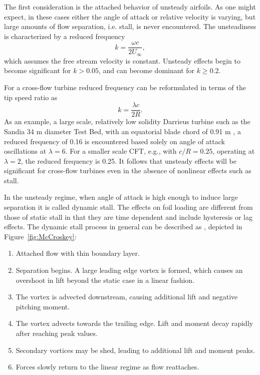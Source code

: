 The first consideration is the attached behavior of unsteady airfoils. As one
might expect, in these cases either the angle of attack or relative velocity is
varying, but large amounts of flow separation, i.e. stall, is never encountered.
The unsteadiness is characterized by a reduced frequency~\cite{Leishman2006}
\begin{equation}
    k = \frac{\omega c}{2 U_\infty},
\end{equation}
which assumes the free stream velocity is constant. Unsteady effects begin to
become significant for $k > 0.05$, and can become dominant for $k \ge 0.2$.

For a cross-flow turbine reduced frequency can be reformulated in terms of the
tip speed ratio as
\begin{equation}
    k = \frac{\lambda c}{2R}.
\end{equation}
As an example, a large scale, relatively low solidity Darrieus turbine such as
the Sandia 34 m diameter Test Bed, with an equatorial blade chord of 0.91 m
\cite{Murray2011}, a reduced frequency of 0.16 is encountered based solely on
angle of attack oscillations at $\lambda=6$. For a smaller scale CFT, e.g., with
$c/R = 0.25$, operating at $\lambda = 2$, the reduced frequency is 0.25. It
follows that unsteady effects will be significant for cross-flow turbines even
in the absence of nonlinear effects such as stall.

In the unsteady regime, when angle of attack is high enough to induce large
separation it is called dynamic stall. The effects on foil loading are different
from those of static stall in that they are time dependent and include
hysteresis or lag effects. The dynamic stall process in general can be described
as \cite{McCroskey1981}, depicted in Figure~\ref{fig:McCroskey}:
\begin{enumerate}
    \item Attached flow with thin boundary layer.

    \item Separation begins. A large leading edge vortex is formed, which causes
    an overshoot in lift beyond the static case in a linear fashion.
    
    \item The vortex is advected downstream, causing additional lift and
    negative pitching moment.
    
    \item The vortex advects towards the trailing edge. Lift and moment decay
    rapidly after reaching peak values.
    
    \item Secondary vortices may be shed, leading to additional lift and moment
    peaks.
    
    \item Forces slowly return to the linear regime as flow reattaches.
\end{enumerate}

